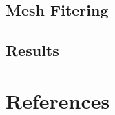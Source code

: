 \documentclass[10pt]{article}
\begin{document}
\subsection{Mesh Fitering}

\subsection{Results}
\cite{first}
\cite{WEBSITE:1}

\newpage
\section{References}


\end{document}
